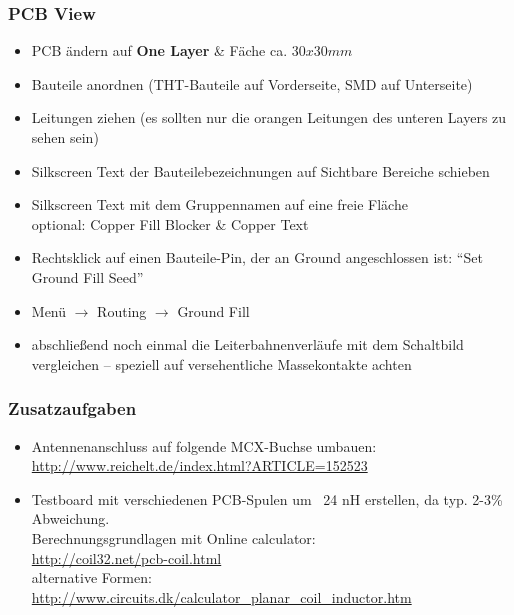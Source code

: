 \subsubsection{PCB View}

\begin{itemize}
    \item PCB ändern auf \textbf{One Layer} \& Fäche ca. $30x30mm$
    \item Bauteile anordnen (THT-Bauteile auf Vorderseite, SMD auf Unterseite)
    \item Leitungen ziehen (es sollten nur die orangen Leitungen des unteren Layers zu sehen sein)
    \item Silkscreen Text der Bauteilebezeichnungen auf Sichtbare Bereiche schieben
    \item Silkscreen Text mit dem Gruppennamen auf eine freie Fläche \\
          optional: Copper Fill Blocker \& Copper Text
    \item Rechtsklick auf einen Bauteile-Pin, der an Ground angeschlossen ist: "`Set Ground Fill Seed"'
    \item Menü $\rightarrow$ Routing $\rightarrow$ Ground Fill
    \item abschließend noch einmal die Leiterbahnenverläufe mit dem Schaltbild
          vergleichen -- speziell auf versehentliche Massekontakte achten
\end{itemize}

\subsubsection{Zusatzaufgaben}

\begin{itemize}
    \item Antennenanschluss auf folgende MCX-Buchse umbauen: \\
          \url{http://www.reichelt.de/index.html?ARTICLE=152523}
    \item Testboard mit verschiedenen PCB-Spulen um ~24 nH erstellen, da typ. 2-3\% Abweichung. \\
          Berechnungsgrundlagen mit Online calculator:\\
          \url{http://coil32.net/pcb-coil.html}\\
          alternative Formen: \\
          \url{http://www.circuits.dk/calculator_planar_coil_inductor.htm}
\end{itemize}
